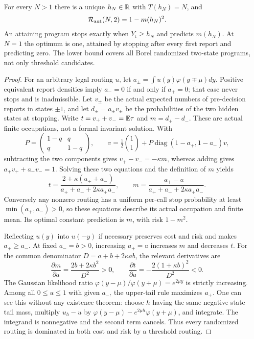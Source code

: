 \begin{theorem}\label{thm:gaussian}
For every $N>1$ there is a unique $h_N\in\mathbb R$ with $T(h_N)=N$, and
\begin{equation}\label{eq:gaussian-risk}
 \mathcal R_{\mathrm{aut}}(N,2)=1-m(h_N)^2.
\end{equation}
An attaining program stops exactly when $Y_t\ge h_N$ and predicts $m(h_N)$. At $N=1$ the optimum is one, attained by stopping after every first report and predicting zero. The lower bound covers all Borel randomized two-state programs, not only threshold candidates.
\end{theorem}
\begin{proof}
For an arbitrary legal routing $u$, let $a_\pm=\int u(y)\varphi(y\mp\mu)dy$. Positive equivalent report densities imply $a_-=0$ if and only if $a_+=0$; that case never stops and is inadmissible. Let $v_\pm$ be the actual expected numbers of pre-decision reports in states $\pm1$, and let $d_\pm=a_\pm v_\pm$ be the probabilities of the two hidden states at stopping. Write $t=v_++v_-=\mathbb E\tau$ and $m=d_+-d_-$. These are actual finite occupations, not a formal invariant solution. With
\[
 P=\begin{pmatrix}1-q&q\\q&1-q\end{pmatrix},\qquad
 v=\tfrac12\binom11+P\operatorname{diag}(1-a_+,1-a_-)v,
\]
subtracting the two components gives $v_+-v_-=-\kappa m$, whereas adding gives $a_+v_++a_-v_-=1$. Solving these two equations and the definition of $m$ yields
\begin{equation}\label{eq:occupation-gaussian}
 t=\frac{2+\kappa(a_++a_-)}{a_++a_-+2\kappa a_+a_-},\qquad
 m=\frac{a_+-a_-}{a_++a_-+2\kappa a_+a_-}.
\end{equation}
Conversely any nonzero routing has a uniform per-call stop probability at least $\min(a_+,a_-)>0$, so these equations describe its actual occupation and finite mean. Its optimal constant prediction is $m$, with risk $1-m^2$.

Reflecting $u(y)$ into $u(-y)$ if necessary preserves cost and risk and makes $a_+\ge a_-$. At fixed $a_-=b>0$, increasing $a_+=a$ increases $m$ and decreases $t$. For the common denominator $D=a+b+2\kappa ab$, the relevant derivatives are
\[
 \frac{\partial m}{\partial a}=\frac{2b+2\kappa b^2}{D^2}>0,
 \qquad
 \frac{\partial t}{\partial a}=-\frac{2(1+\kappa b)^2}{D^2}<0.
\]
The Gaussian likelihood ratio $\varphi(y-\mu)/\varphi(y+\mu)=e^{2\mu y}$ is strictly increasing. Among all $0\le u\le1$ with given $a_-$, the upper-tail rule maximizes $a_+$. One can see this without any existence theorem: choose $h$ having the same negative-state tail mass, multiply $u_h-u$ by $\varphi(y-\mu)-e^{2\mu h}\varphi(y+\mu)$, and integrate. The integrand is nonnegative and the second term cancels. Thus every randomized routing is dominated in both cost and risk by a threshold routing.


\end{proof}
